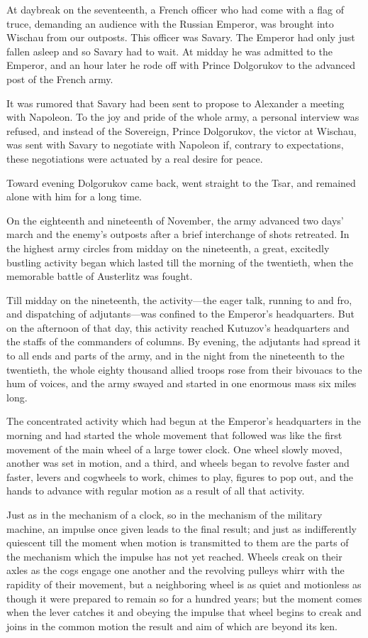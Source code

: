 At daybreak on the seventeenth, a French officer who had come
with a flag of truce, demanding an audience with the Russian
Emperor, was brought into Wischau from our outposts. This officer
was Savary. The Emperor had only just fallen asleep and so Savary
had to wait. At midday he was admitted to the Emperor, and an
hour later he rode off with Prince Dolgorukov to the advanced
post of the French army.

It was rumored that Savary had been sent to propose to Alexander
a meeting with Napoleon. To the joy and pride of the whole army,
a personal interview was refused, and instead of the Sovereign,
Prince Dolgorukov, the victor at Wischau, was sent with Savary to
negotiate with Napoleon if, contrary to expectations, these
negotiations were actuated by a real desire for peace.

Toward evening Dolgorukov came back, went straight to the Tsar,
and remained alone with him for a long time.

On the eighteenth and nineteenth of November, the army advanced
two days' march and the enemy's outposts after a brief
interchange of shots retreated. In the highest army circles from
midday on the nineteenth, a great, excitedly bustling activity
began which lasted till the morning of the twentieth, when the
memorable battle of Austerlitz was fought.

Till midday on the nineteenth, the activity---the eager talk,
running to and fro, and dispatching of adjutants---was confined
to the Emperor's headquarters. But on the afternoon of that day,
this activity reached Kutuzov's headquarters and the staffs of
the commanders of columns. By evening, the adjutants had spread
it to all ends and parts of the army, and in the night from the
nineteenth to the twentieth, the whole eighty thousand allied
troops rose from their bivouacs to the hum of voices, and the
army swayed and started in one enormous mass six miles long.

The concentrated activity which had begun at the Emperor's
headquarters in the morning and had started the whole movement
that followed was like the first movement of the main wheel of a
large tower clock. One wheel slowly moved, another was set in
motion, and a third, and wheels began to revolve faster and
faster, levers and cogwheels to work, chimes to play, figures to
pop out, and the hands to advance with regular motion as a result
of all that activity.

Just as in the mechanism of a clock, so in the mechanism of the
military machine, an impulse once given leads to the final
result; and just as indifferently quiescent till the moment when
motion is transmitted to them are the parts of the mechanism
which the impulse has not yet reached. Wheels creak on their
axles as the cogs engage one another and the revolving pulleys
whirr with the rapidity of their movement, but a neighboring
wheel is as quiet and motionless as though it were prepared to
remain so for a hundred years; but the moment comes when the
lever catches it and obeying the impulse that wheel begins to
creak and joins in the common motion the result and aim of which
are beyond its ken.

